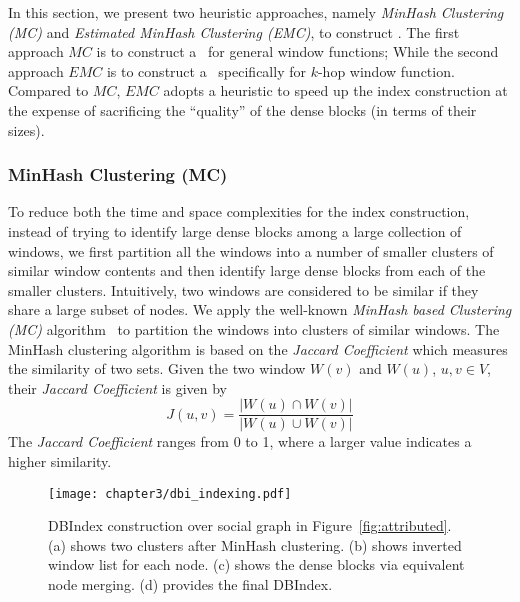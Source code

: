 In this section, we present two heuristic approaches, namely {\it MinHash Clustering (MC)} and {\it Estimated MinHash Clustering (EMC)}, to construct \DBIndex . The first approach $MC$ is to construct
a \DBIndex\ for general window functions; While the second approach $EMC$ is 
to construct a \DBIndex\ specifically for $k$-hop window function. Compared to $MC$, $EMC$
adopts a heuristic to speed up the index construction at the expense of sacrificing 
the ``quality'' of the dense blocks (in terms of their sizes).


\subsubsection{MinHash Clustering (MC)}
To reduce both the time and space complexities for the index construction,
instead of trying to identify large dense blocks among a large collection of windows,
we first partition all the windows 
into a number of smaller clusters of 
similar window contents and then identify large dense blocks 
from each of the smaller clusters.
Intuitively, two windows are considered to 
be similar if they share a large subset of nodes.
We apply the well-known {\it MinHash based Clustering (MC)} algorithm~\cite{broder1997syntactic} 
to partition the windows into clusters of similar windows.
The MinHash clustering algorithm is based on the
\emph{Jaccard Coefficient} which measures the similarity of two sets.  
Given the two window $W(v)$ and $W(u)$, $u,v \in V$,
their \emph{Jaccard Coefficient} is given by
\begin{equation} \label{eq:jacc_sim}
	J(u,v) = \frac{|W(u) \cap W(v)|}{|W(u) \cup W(v)|}
\end{equation}
The \emph{Jaccard Coefficient} ranges from 0 to 1, where a larger value indicates
a higher similarity.

\begin{figure}[h]
\centering
\texttt{[image: chapter3/dbi\_indexing.pdf]}
\caption{DBIndex construction over social graph in Figure~\ref{fig:attributed}. (a) shows two clusters after MinHash clustering. (b) shows inverted window list for each node. (c) shows the dense blocks via equivalent node merging. (d) provides the final DBIndex.}
\label{fig:dbi-indexing}
\end{figure}


